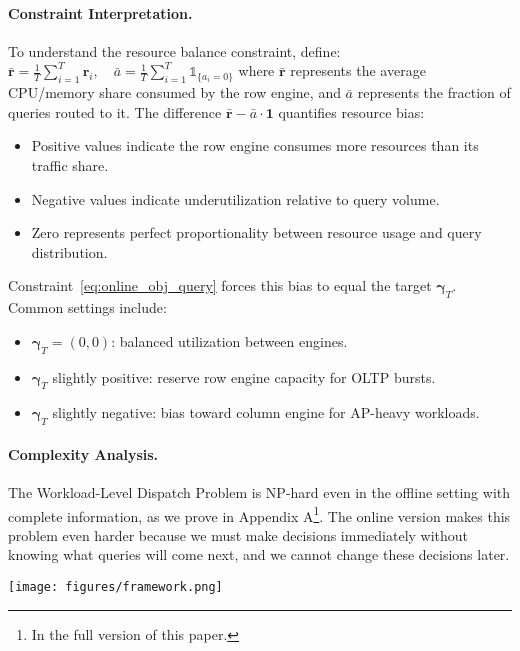 \documentclass[sigconf, nonacm]{acmart}
\newcommand{\dispatcher}{AQD\xspace}
\begin{document}
\paragraph{Constraint Interpretation.}
To understand the resource balance constraint, define:
\(
  \bar{\mathbf{r}}=\frac{1}{T}\sum_{i=1}^{T}\mathbf{r}_i, \quad
  \bar{a}=\frac{1}{T}\sum_{i=1}^{T}\mathds{1}_{\{a_i=0\}}
\)
where $\bar{\mathbf{r}}$ represents the average CPU/memory share consumed by the row engine, and $\bar{a}$ represents the fraction of queries routed to it. The difference $\bar{\mathbf{r}}-\bar{a}\cdot\mathbf{1}$ quantifies resource bias:
\begin{itemize}[leftmargin=*]
    \item Positive values indicate the row engine consumes more resources than its traffic share.
    \item Negative values indicate underutilization relative to query volume.
    \item Zero represents perfect proportionality between resource usage and query distribution.
\end{itemize}

Constraint~\eqref{eq:online_obj_query} forces this bias to equal the target $\boldsymbol{\gamma}_T$. Common settings include:
\begin{itemize}[leftmargin=*]
    \item $\boldsymbol{\gamma}_T=(0,0)$: balanced utilization between engines.
    \item $\boldsymbol{\gamma}_T$ slightly positive: reserve row engine capacity for OLTP bursts.
    \item $\boldsymbol{\gamma}_T$ slightly negative: bias toward column engine for AP-heavy workloads.
\end{itemize}

\paragraph{Complexity Analysis.}
The Workload-Level Dispatch Problem is NP-hard even in the offline setting with complete information, as we prove in Appendix A\footnote{In the full version of this paper.}. The online version makes this problem even harder because we must make decisions immediately without knowing what queries will come next, and we cannot change these decisions later.

\begin{figure*}[t]
  \centering
  \texttt{[image: figures/framework.png]}
  \caption{Framework of \dispatcher}
  \vspace{-1em}
  \label{fig:framework}
\end{figure*}
\end{document}
